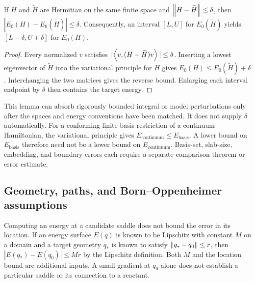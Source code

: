 \begin{lemma}
\label{lem:perturbation}
If $H$ and $\widetilde H$ are Hermitian on the same finite space and
$\left\lVert H-\widetilde H\right\rVert\le\delta$, then
$|E_0(H)-E_0(\widetilde H)|\le\delta$. Consequently, an interval
$[L,U]$ for $E_0(\widetilde H)$ yields $[L-\delta,U+\delta]$ for
$E_0(H)$.
\end{lemma}
\begin{proof}
Every normalized $v$ satisfies
$|\left\langle v,(H-\widetilde H)v\right\rangle|\le\delta$. Inserting a lowest eigenvector
of $\widetilde H$ into the variational principle for $H$ gives
$E_0(H)\le E_0(\widetilde H)+\delta$. Interchanging the two matrices
gives the reverse bound. Enlarging each interval endpoint by $\delta$
then contains the target energy.
\end{proof}

This lemma can absorb rigorously bounded integral or model perturbations
only after the spaces and energy conventions have been matched. It does not
supply $\delta$ automatically. For a conforming finite-basis restriction of
a continuum Hamiltonian, the variational principle gives
$E_{\mathrm{continuum}}\le E_{\mathrm{basis}}$. A lower bound on
$E_{\mathrm{basis}}$ therefore need not be a lower bound on
$E_{\mathrm{continuum}}$. Basis-set, slab-size, embedding, and boundary
errors each require a separate comparison theorem or error estimate.

\subsection{Geometry, paths, and Born--Oppenheimer assumptions}
Computing an energy at a candidate saddle does not bound the error in its
location. If an energy surface $E(q)$ is known to be Lipschitz with constant
$M$ on a domain and a target geometry $q_*$ is known to satisfy
$\left\lVert q_*-q_0\right\rVert\le r$, then $|E(q_*)-E(q_0)|\le Mr$ by the
Lipschitz definition. Both $M$ and the location bound are additional inputs.
A small gradient at $q_0$ alone does not establish a particular saddle or
its connection to a reactant.

